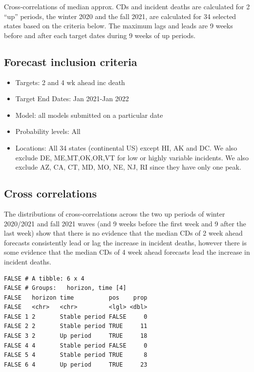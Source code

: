 \documentclass[
]{article}
\providecommand{\tightlist}{%
  \setlength{\itemsep}{0pt}\setlength{\parskip}{0pt}}
\begin{document}
Cross-correlations of median approx. CDs and incident deaths are
calculated for 2 ``up'' periods, the winter 2020 and the fall 2021, are
calculated for 34 selected states based on the criteria below. The
maximum lags and leads are 9 weeks before and after each target dates
during 9 weeks of up periods.

\hypertarget{forecast-inclusion-criteria}{%
\subsection{Forecast inclusion
criteria}\label{forecast-inclusion-criteria}}

\begin{itemize}
\tightlist
\item
  Targets: 2 and 4 wk ahead inc death
\item
  Target End Dates: Jan 2021-Jan 2022
\item
  Model: all models submitted on a particular date
\item
  Probability levels: All
\item
  Locations: All 34 states (continental US) except HI, AK and DC. We
  also exclude DE, ME,MT,OK,OR,VT for low or highly variable incidents.
  We also exclude AZ, CA, CT, MD, MO, NE, NJ, RI since they have only
  one peak.
\end{itemize}

\hypertarget{cross-correlations}{%
\subsection{Cross correlations}\label{cross-correlations}}

The distributions of cross-correlations across the two up periods of
winter 2020/2021 and fall 2021 waves (and 9 weeks before the first week
and 9 after the last week) show that there is no evidence that the
median CDs of 2 week ahead forecasts consistently lead or lag the
increase in incident deaths, however there is some evidence that the
median CDs of 4 week ahead forecasts lead the increase in incident
deaths.

\begin{verbatim}
FALSE # A tibble: 6 x 4
FALSE # Groups:   horizon, time [4]
FALSE   horizon time          pos    prop
FALSE   <chr>   <chr>         <lgl> <dbl>
FALSE 1 2       Stable period FALSE     0
FALSE 2 2       Stable period TRUE     11
FALSE 3 2       Up period     TRUE     18
FALSE 4 4       Stable period FALSE     0
FALSE 5 4       Stable period TRUE      8
FALSE 6 4       Up period     TRUE     23
\end{verbatim}
\end{document}
